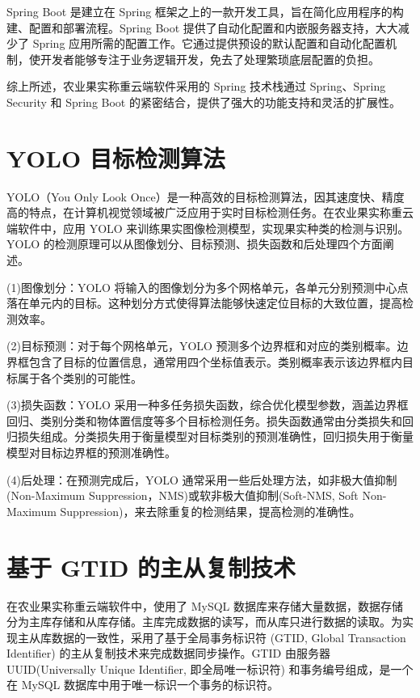 Spring Boot 是建立在 Spring 框架之上的一款开发工具，旨在简化应用程序的构建、配置和部署流程。Spring Boot 提供了自动化配置和内嵌服务器支持，大大减少了 Spring 应用所需的配置工作。它通过提供预设的默认配置和自动化配置机制，使开发者能够专注于业务逻辑开发，免去了处理繁琐底层配置的负担\cite{Spring-Boot-概述}。

综上所述，农业果实称重云端软件采用的 Spring 技术栈通过 Spring、Spring Security 和 Spring Boot 的紧密结合，提供了强大的功能支持和灵活的扩展性。

\section{YOLO 目标检测算法}\label{sec:yolo}

YOLO（You Only Look Once）是一种高效的目标检测算法，因其速度快、精度高的特点，在计算机视觉领域被广泛应用于实时目标检测任务\cite{Lin2019}。在农业果实称重云端软件中，应用 YOLO 来训练果实图像检测模型，实现果实种类的检测与识别。YOLO 的检测原理可以从图像划分、目标预测、损失函数和后处理四个方面阐述。

(1)图像划分：YOLO 将输入的图像划分为多个网格单元，各单元分别预测中心点落在单元内的目标。这种划分方式使得算法能够快速定位目标的大致位置，提高检测效率\cite{Liu2023-yolov8}。

(2)目标预测：对于每个网格单元，YOLO 预测多个边界框和对应的类别概率。边界框包含了目标的位置信息，通常用四个坐标值表示。类别概率表示该边界框内目标属于各个类别的可能性\cite{Liu2023-yolov8}。

(3)损失函数：YOLO 采用一种多任务损失函数，综合优化模型参数，涵盖边界框回归、类别分类和物体置信度等多个目标检测任务\cite{Liu2023-yolov8}。损失函数通常由分类损失和回归损失组成。分类损失用于衡量模型对目标类别的预测准确性，回归损失用于衡量模型对目标边界框的预测准确性。

(4)后处理：在预测完成后，YOLO 通常采用一些后处理方法，如非极大值抑制(Non-Maximum Suppression，NMS)或软非极大值抑制(Soft-NMS, Soft Non-Maximum Suppression)\cite{Lin2019}，来去除重复的检测结果，提高检测的准确性。

\section{基于 GTID 的主从复制技术}\label{sec:gtid}

在农业果实称重云端软件中，使用了 MySQL 数据库来存储大量数据，数据存储分为主库存储和从库存储。主库完成数据的读写，而从库只进行数据的读取。为实现主从库数据的一致性，采用了基于全局事务标识符 (GTID, Global Transaction Identifier) 的主从复制技术来完成数据同步操作。GTID 由服务器 UUID(Universally Unique Identifier, 即全局唯一标识符) 和事务编号组成，是一个在 MySQL 数据库中用于唯一标识一个事务的标识符。

